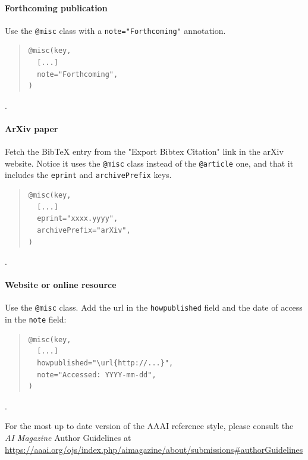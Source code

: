 \documentclass[letterpaper]{article} %
\begin{document}
\paragraph{Forthcoming publication~\nocite{c:21}} Use the \texttt{@misc} class with a \texttt{note="Forthcoming"} annotation.
\begin{quote}
\begin{footnotesize}
\begin{verbatim}
@misc(key,
  [...]
  note="Forthcoming",
)
\end{verbatim}
\end{footnotesize}
\end{quote}
.

\paragraph{ArXiv paper~\nocite{c:22}} Fetch the BibTeX entry from the "Export Bibtex Citation" link in the arXiv website. Notice it uses the \texttt{@misc} class instead of the \texttt{@article} one, and that it includes the \texttt{eprint} and \texttt{archivePrefix} keys.
\begin{quote}
\begin{footnotesize}
\begin{verbatim}
@misc(key,
  [...]
  eprint="xxxx.yyyy",
  archivePrefix="arXiv",
)
\end{verbatim}
\end{footnotesize}
\end{quote}
.

\paragraph{Website or online resource~\nocite{c:23}} Use the \texttt{@misc} class. Add the url in the \texttt{howpublished} field and the date of access in the \texttt{note} field:
\begin{quote}
\begin{footnotesize}
\begin{verbatim}
@misc(key,
  [...]
  howpublished="\url{http://...}",
  note="Accessed: YYYY-mm-dd",
)
\end{verbatim}
\end{footnotesize}
\end{quote}
.

\vspace{.2em}
For the most up to date version of the AAAI reference style, please consult the \textit{AI Magazine} Author Guidelines at \url{https://aaai.org/ojs/index.php/aimagazine/about/submissions#authorGuidelines}
\end{document}
